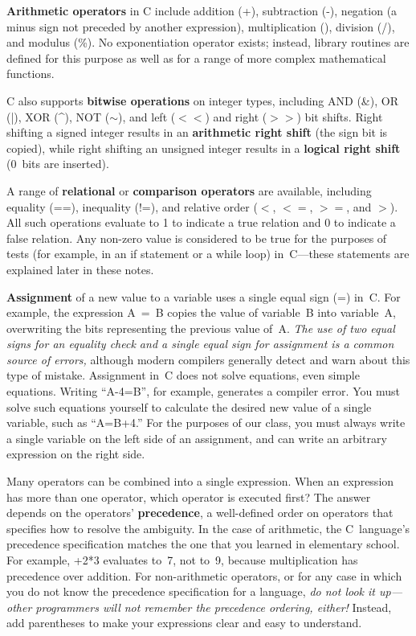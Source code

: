 \pagebreak

{\bf Arithmetic operators} in C include addition ({\tfix +}), 
subtraction ({\tfix -}), negation (a minus sign not 
preceded by another expression), multiplication ({\tfix *}), 
division ({\tfix /}), and modulus ({\tfix \%}).  No exponentiation
operator exists; instead, library routines are defined for this purpose
as well as for a range of more complex mathematical functions.

C also supports {\bf bitwise operations} on integer types, including 
AND ({\tfix \&}), OR ({\tfix |}), XOR ({\tfix \^{ }}), NOT ({\tfix $\sim$}), 
and left ({\tfix $<<$}) and right ({\tfix $>>$}) bit shifts.
Right shifting a signed integer results in an {\bf arithmetic right shift}
(the sign bit is copied), while right shifting an unsigned integer
results in a {\bf logical right shift} (0~bits are inserted).

A range of {\bf relational} or {\bf comparison operators} are 
available, including equality ({\tfix ==}),
inequality ({\tfix !=}), and relative order ({\tfix $<$}, {\tfix $<=$},
{\tfix $>=$}, and {\tfix $>$}).
%
All such operations evaluate to 1 to indicate a true relation
and 0 to indicate a false relation.  Any non-zero value is considered
to be true for the purposes of tests (for example, in an {\tfix if} statement
or a {\tfix while} loop) in~C---these statements are explained later in 
these notes.

{\bf Assignment} of a new value to a variable 
uses a single equal sign ({\tfix =}) in~C.  
%
For example, the expression {\tfix A~=~B} copies
the value of variable~{\tfix B} into variable~{\tfix A}, overwriting the
bits representing the previous value of~{\tfix A}.
%
{\em The use of two equal signs for an equality check and a single
equal sign for assignment is a common source of errors,} although
modern compilers generally detect and warn about this type of mistake.
%
Assignment in~C does not solve equations, even simple equations.  
Writing ``{\tfix A-4=B}'', for example, generates a compiler error.
You must solve such equations yourself to calculate the desired
new value of a single variable, such as ``{\tfix  A=B+4}.''
For the purposes of our class, you must always write a single variable 
on the left side of an assignment, and can write an arbitrary expression 
on the right side.

Many operators can be combined into a single expression.  When an
expression has more than one operator, which operator is executed first?
The answer depends on the operators' {\bf precedence}, a well-defined order on
operators that specifies how to resolve the ambiguity.  In the case
of arithmetic, the C~language's precedence specification matches the
one that you learned in elementary school.  For example, {+2*3}
evaluates to~7, not to~9, because multiplication has precedence over
addition.  For non-arithmetic operators, or for any case in which
you do not know the precedence specification for a language, {\it
do not look it up---other programmers will not remember the
precedence ordering, either!}  Instead, add parentheses to make your 
expressions clear and easy to understand.\\


